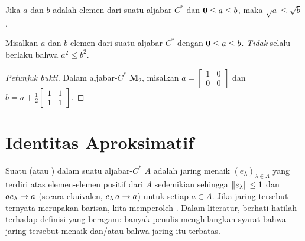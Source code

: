 \begin{prop} Jika $a$ dan $b$ adalah elemen dari suatu aljabar-$C^*$ dan $\mathbf{0} \le a \le b$,
maka $\sqrt a \le \sqrt b$.
\end{prop}

\begin{exam} Misalkan $a$ dan $b$ elemen dari suatu aljabar-$C^*$ dengan $\mathbf{0} \le a \le b$.
\emph{Tidak} selalu berlaku bahwa $a^2 \le b^2$.
\end{exam}

\begin{proof}[\emph{Petunjuk bukti}] Dalam aljabar-$C^*$ $\mathbf M_2$, misalkan $a =
\begin{bmatrix} 1 & 0 \\ 0 & 0 \end{bmatrix}$ dan
$b = a + \tfrac12 \begin{bmatrix} 1 & 1 \\ 1 & 1 \end{bmatrix}$. \ns
\end{proof}
























\section{Identitas Aproksimatif}
\begin{defn} Suatu
 (atau
) dalam suatu aljabar-$C^*$ $A$ adalah jaring menaik
${(e_\lambda)}_{\lambda \in \Lambda}$ yang terdiri atas elemen-elemen positif dari $A$ sedemikian sehingga
$\lVert e_\lambda\rVert \le 1$ dan $ae_\lambda \rightarrow a$ (secara ekuivalen, $e_\lambda\, a \rightarrow a$)
untuk setiap $a \in A$. Jika jaring tersebut ternyata merupakan barisan, kita memperoleh
. Dalam literatur, berhati-hatilah terhadap definisi yang
beragam: banyak penulis menghilangkan syarat bahwa jaring tersebut menaik dan/atau bahwa jaring itu
terbatas.
\end{defn}

